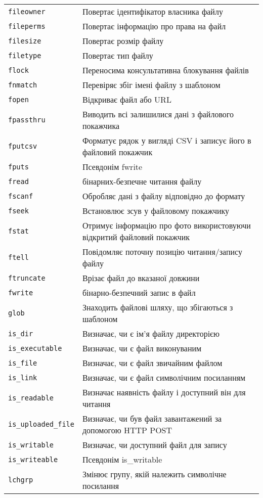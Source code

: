 \begin{longtable}[t]{|l|p{20em}|}
\verb'fileowner' & Повертає ідентифікатор власника файлу\\
\verb'fileperms' & Повертає інформацію про права на файл\\
\verb'filesize' & Повертає розмір файлу\\
\verb'filetype' & Повертає тип файлу\\
\verb'flock' & Переносима консультативна блокування файлів\\
\verb'fnmatch' & Перевіряє збіг імені файлу з шаблоном\\
\verb'fopen' & Відкриває файл або URL\\
\verb'fpassthru' & Виводить всі залишилися дані з файлового покажчика\\
\verb'fputcsv' & Форматує рядок у вигляді CSV і записує його в файловий покажчик\\
\verb'fputs' & Псевдонім fwrite\\
\verb'fread' & бінарних-безпечне читання файлу\\
\verb'fscanf' & Обробляє дані з файлу відповідно до формату\\
\verb'fseek' & Встановлює зсув у файловому покажчику\\
\verb'fstat' & Отримує інформацію про фото використовуючи відкритий файловий покажчик\\
\verb'ftell' & Повідомляє поточну позицію читання/запису файлу\\
\verb'ftruncate' & Врізає файл до вказаної довжини\\
\verb'fwrite' & бінарно-безпечний запис в файл\\
\verb'glob' & Знаходить файлові шляху, що збігаються з шаблоном\\
\verb'is_dir' & Визначає, чи є ім'я файлу директорією\\
\verb'is_executable' & Визначає, чи є файл виконуваним\\
\verb'is_file' & Визначає, чи є файл звичайним файлом\\
\verb'is_link' & Визначає, чи є файл символічним посиланням\\
\verb'is_readable' & Визначає наявність файлу і доступний він для читання\\
\verb'is_uploaded_file' & Визначає, чи був файл завантажений за допомогою HTTP POST\\
\verb'is_writable' & Визначає, чи доступний файл для запису\\
\verb'is_writeable' & Псевдонім is\_writable\\
\verb'lchgrp' & Змінює групу, якій належить символічне посилання\\

\end{longtable}

